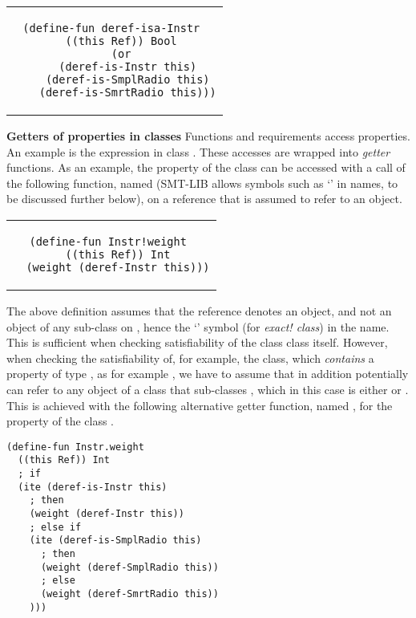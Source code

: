 \begin{center}
\begin{tabular}{c}
\small
\begin{lstlisting}
(define-fun deref-isa-Instr 
  ((this Ref)) Bool
  (or
    (deref-is-Instr this)
    (deref-is-SmplRadio this)
    (deref-is-SmrtRadio this)))
\end{lstlisting}
\end{tabular}
\end{center}

\textbf{Getters of properties in classes} Functions and requirements
access properties. An example is the expression  in
class .  These accesses are wrapped into {\em getter}
functions. As an example, the  property of the class
 can be accessed with a call of the following
function, named  (SMT-LIB allows symbols such
as `\code{!}'  in names, to be discussed further below), on a
reference that is assumed to refer to an  object.

\begin{center}
\begin{tabular}{c}
\small
\begin{lstlisting}
(define-fun Instr!weight 
  ((this Ref)) Int
  (weight (deref-Instr this)))
\end{lstlisting}
\end{tabular}
\end{center}

\noindent The above definition assumes that the  reference
denotes an  object, and not an object of any
sub-class on , hence the `\code{!}' symbol (for {\em
  exact!  class}) in the name.  This is sufficient when checking
satisfiability of the class  class itself. However,
when checking the satisfiability of, for example, the
 class, which {\em contains} a property of type
, as for example , we have
to assume that  in addition potentially can refer to any
object of a class that sub-classes , which in this
case is either  or . This is
achieved with the following alternative getter function, named
, for the  property of the class
.

\begin{center}
\small
\begin{lstlisting}
(define-fun Instr.weight 
  ((this Ref)) Int
  ; if
  (ite (deref-is-Instr this)         
    ; then
    (weight (deref-Instr this))      
    ; else if
    (ite (deref-is-SmplRadio this)      
      ; then
      (weight (deref-SmplRadio this))   
      ; else
      (weight (deref-SmrtRadio this))
    )))
\end{lstlisting}
\end{center}

